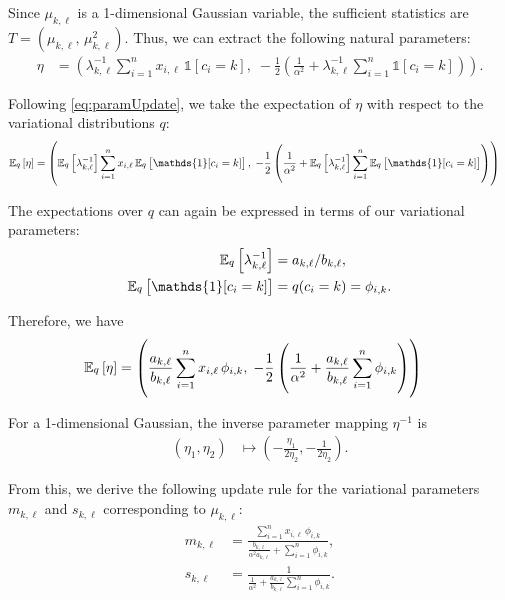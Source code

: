 \documentclass[11pt]{article}
\begin{document}
Since $\mu_{k,\ell}$ is a 1-dimensional Gaussian variable, the sufficient statistics are $T = (\mu_{k,\ell}, \, \mu_{k,\ell}^2)$.
Thus, we can extract the following natural parameters:
\begin{align}
\eta &= \left(
    \lambda_{k,\ell}^{-1} \sum_{i=1}^n x_{i,\ell} \, \mathds{1}[c_i=k], \;
    -\frac{1}{2} \left( \frac{1}{\alpha^2} + \lambda_{k,\ell}^{-1} \sum_{i=1}^n \mathds{1}[c_i=k] \right)
\right).
\end{align}

Following \eqref{eq:paramUpdate}, we take the expectation of $\eta$ with respect to the variational distributions $q$:
\begin{align}
\expectOver{q}{\eta}
&=
\left(
    \expectOver{q}{\lambda_{k,\ell}^{-1}} \sum_{i=1}^n x_{i,\ell} \, \expectOver{q}{\mathds{1}[c_i=k]}, \;
    -\frac{1}{2} \left( \frac{1}{\alpha^2} + \expectOver{q}{\lambda_{k,\ell}^{-1}} \sum_{i=1}^n \expectOver{q}{\mathds{1}[c_i=k]} \right)
\right)
\end{align}

The expectations over $q$ can again be expressed in terms of our variational parameters:
\begin{align}
\expectOver{q}{\lambda_{k,\ell}^{-1}} &= a_{k,\ell} / b_{k,\ell}, \\
\expectOver{q}{\mathds{1}[c_i=k]} &= q(c_i = k) = \phi_{i,k}.
\end{align}

Therefore, we have
\begin{align}
\mathbb{E}_{\substack{q}}\left[ \eta \right]
&=
\left(
    \frac{a_{k,\ell}}{b_{k,\ell}} \sum_{i=1}^n x_{i,\ell} \, \phi_{i,k}, \;
    -\frac{1}{2} \left( \frac{1}{\alpha^2} + \frac{a_{k,\ell}}{b_{k,\ell}} \sum_{i=1}^n \phi_{i,k} \right)
\right)
\end{align}

For a 1-dimensional Gaussian, the inverse parameter mapping $\eta^{-1}$ is
\begin{align}
(\eta_1, \eta_2)
&\mapsto
\left( -\frac{\eta_1}{2 \eta_2}, -\frac{1}{2 \eta_2} \right).
\end{align}

From this, we derive the following update rule for the variational parameters $m_{k,\ell}$ and $s_{k,\ell}$ corresponding to $\mu_{k,\ell}$:
\begin{align}
\label{eq:exVarUpdateM}
m_{k,\ell} &= \frac{ \sum_{i=1}^n x_{i,\ell} \, \phi_{i,k} }
                   { \frac{b_{k,\ell}}{\alpha^2 a_{k,\ell}} + \sum_{i=1}^n \phi_{i,k} }, \\
\label{eq:exVarUpdateS}
s_{k,\ell} &= \frac{ 1 }
                   { \frac{1}{\alpha^2} + \frac{a_{k,\ell}}{b_{k,\ell}} \sum_{i=1}^n \phi_{i,k} }.
\end{align}
\end{document}
